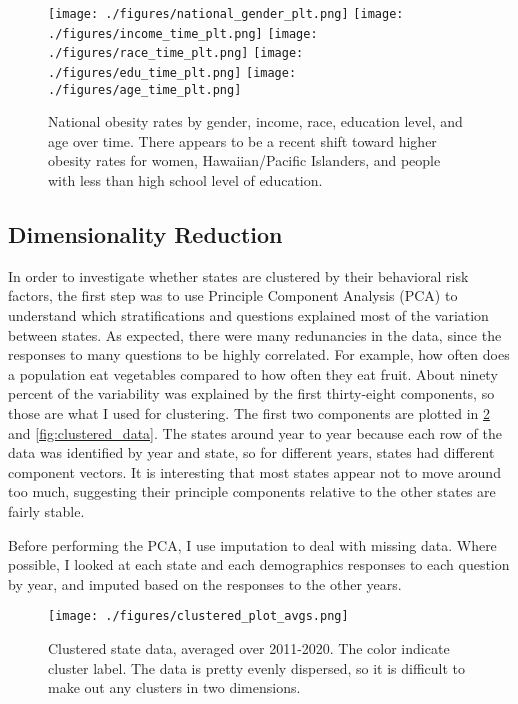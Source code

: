 \documentclass[11pt]{article}
\begin{document}
\begin{figure}[htbp]
\texttt{[image: ./figures/national\_gender\_plt.png]}
\texttt{[image: ./figures/income\_time\_plt.png]}
\texttt{[image: ./figures/race\_time\_plt.png]}
\texttt{[image: ./figures/edu\_time\_plt.png]}
\texttt{[image: ./figures/age\_time\_plt.png]}
\caption{
  National obesity rates by gender, income, race, education level, and age over time. There appears to be a recent shift toward higher obesity rates for women, Hawaiian/Pacific Islanders, and people with less than high school level of education. 
}
\label{fig:dems_by_time}
\end{figure}

\subsection{Dimensionality Reduction}
In order to investigate whether states are clustered by their behavioral risk factors, the first step was to use Principle Component Analysis (PCA) to understand which stratifications and questions explained most of the variation between states. As expected, there were many redunancies in the data, since the responses to many questions to be highly correlated. For example, how often does a population eat vegetables compared to how often they eat fruit. About ninety percent of the variability was explained by the first thirty-eight components, so those are what I used for clustering. The first two components are plotted in  \ref{fig:clustered_avgs} and \ref{fig:clustered_data}. The states around year to year because each row of the data was identified by year and state, so for different years, states had different component vectors. It is interesting that most states appear not to move around too much, suggesting their principle components relative to the other states are fairly stable.

Before performing the PCA, I use imputation to deal with missing data. Where possible, I looked at each state and each demographics responses to each question by year, and imputed based on the responses to the other years.

\begin{figure}[hp]
\texttt{[image: ./figures/clustered\_plot\_avgs.png]}
\caption{
  Clustered state data, averaged over 2011-2020. The color indicate cluster label. The data is pretty evenly dispersed, so it is difficult to make out any clusters in two dimensions. 
}
\label{fig:clustered_avgs}
\end{figure}
\end{document}
